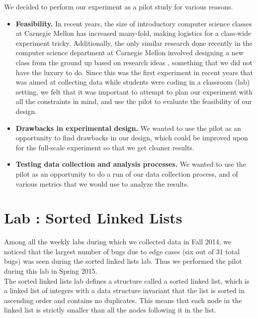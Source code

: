 \documentclass[11pt,letterpaper]{article}
\begin{document}
We decided to perform our experiment as a pilot study for various reasons.
\begin{itemize}
\item{\textbf{Feasibility.} In recent years, the size of introductory computer science classes at Carnegie Mellon has increased many-fold, making logistics for a class-wide experiment tricky. Additionally, the only similar research done recently in the computer science department at Carnegie Mellon involved designing a new class from the ground up based on research ideas \cite{Blank14}, something that we did not have the luxury to do. Since this was the first experiment in recent years that was aimed at collecting data while students were coding in a classroom (lab) setting, we felt that it was important to attempt to plan our experiment with all the constraints in mind, and use the pilot to evaluate the feasibility of our design.}

\item{\textbf{Drawbacks in experimental design.} We wanted to use the pilot as an opportunity to find drawbacks in our design, which could be improved upon for the full-scale experiment so that we get cleaner results.}

\item{\textbf{Testing data collection and analysis processes.} We wanted to use the pilot as an opportunity to do a run of our data collection process, and of various metrics that we would use to analyze the results.}
\end{itemize}


\section{Lab : Sorted Linked Lists}
\label{sec:lab}

Among all the weekly labs during which we collected data in Fall 2014, we noticed that the largest number of bugs due to edge cases (six out of 31 total bugs) was seen during the sorted linked lists lab. Thus we performed the pilot during this lab in Spring 2015.\\

The sorted linked lists lab defines a structure called a sorted linked list, which is a linked list of integers with a data structure invariant that the list is sorted in ascending order and contains no duplicates. This means that each node in the linked list is strictly smaller than all the nodes following it in the list.\\
\end{document}
